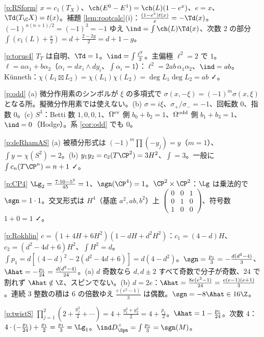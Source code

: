 \begin{sol}{\ref{p:RSform}}
$x=c_1(T_X)$、$\ch(E^0-E^1)=\ch(L)(1-e^x)$、$e=x$、$\Td(T_{\C}X)=t(x)$。補題 \ref{lem:rootcalc}(i)：$\frac{(1-e^x)t(x)}x=-\Td(x)$。$(-1)^{n(n+1)/2}=(-1)^3=-1$ ゆえ $\ind=\int\ch(L)\Td(x)$、次数 2 の部分 $\int(c_1(L)+\frac x2)=d+\frac{2-2g}2=d+1-g$。
\end{sol}
\begin{sol}{\ref{p:torus4}}
$T_T$ は自明、$\Td=1$。$\ind=\int\frac{\ell^2}2$。主偏極 $\ell^2=2$ で $1$。$\ell=a\alpha_1+b\alpha_2$（$\alpha_i=dx_i\wedge dy_i$、$\int\alpha_i=1$）：$\ell^2=2ab\,\alpha_1\alpha_2$、$\ind=ab$。Künneth：$\chi(L_1\boxtimes L_2)=\chi(L_1)\chi(L_2)=\deg L_1\deg L_2=ab$ ✓。
\end{sol}
\begin{sol}{\ref{p:odd}}
(a) 微分作用素のシンボルが $\xi$ の多項式で $\sigma(x,-\xi)=(-1)^m\sigma(x,\xi)$ となる所。擬微分作用素では使えない。(b) $\sigma=i\xi$、$\sigma_+/\sigma_-=-1$、回転数 $0$、指数 $0$。(c) $S^3$：Betti 数 $1,0,0,1$、$\Omega^{\rm ev}$ 側 $b_0+b_2=1$、$\Omega^{\rm odd}$ 側 $b_1+b_3=1$、$\ind=0$（Hodge）。系 \ref{cor:odd} でも $0$。
\end{sol}
\begin{sol}{\ref{p:deRhamAS}}
(a) 被積分形式は $(-1)^m\prod(-y_j)=y$（$m=1$）、$\int y=\chi(S^2)=2$。(b) $y_1y_2=c_2(T\CP^2)=3H^2$、$\int=3$。一般に $\int c_n(T\CP^n)=n+1$ ✓。
\end{sol}
\begin{sol}{\ref{p:CP4}}
$\Lg_2=\frac{7\cdot10-5^2}{45}=1$、$\sgn(\CP^4)=1$。$\CP^2\times\CP^2$：$\Lg$ は乗法的で $\sgn=1\cdot1$。交叉形式は $H^4$（基底 $a^2,ab,b^2$）上 $\begin{pmatrix}0&0&1\\0&1&0\\1&0&0\end{pmatrix}$、符号数 $1+0=1$ ✓。
\end{sol}
\begin{sol}{\ref{p:Rokhlin}}
$c=(1+4H+6H^2)(1-dH+d^2H^2)$：$c_1=(4-d)H$、$c_2=(d^2-4d+6)H^2$、$\int H^2=d$。$\int p_1=d[(4-d)^2-2(d^2-4d+6)]=d(4-d^2)$。$\sgn=\frac{p_1}3=-\frac{d(d^2-4)}3$、$\Ahat=-\frac{p_1}{24}=\frac{d(d^2-4)}{24}$。(a) $d$ 奇数なら $d,d\pm2$ すべて奇数で分子が奇数、$24$ で割れず $\Ahat\notin\Z$、スピンでない。(b) $d=2e$：$\Ahat=\frac{8e(e^2-1)}{24}=\frac{e(e-1)(e+1)}3$。連続 3 整数の積は 6 の倍数ゆえ $\frac{e(e^2-1)}{3}$ は偶数。$\sgn=-8\Ahat\in16\Z$。
\end{sol}
\begin{sol}{\ref{p:twistS}}
$\prod_{j=1}^2(2+\frac{y_j^2}4+\cdots)=4+\frac{y_1^2+y_2^2}2=4+\frac{p_1}2$。$\Ahat=1-\frac{p_1}{24}$。次数 4：$4\cdot(-\frac{p_1}{24})+\frac{p_1}2=\frac{p_1}3=\Lg_1$。$\ind D_{\Spn}^+=\int\frac{p_1}3=\sgn(M)$。
\end{sol}
